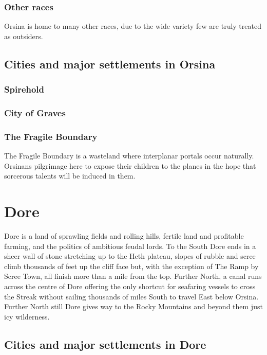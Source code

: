 \documentclass[10pt,twoside,twocolumn,openany,justified,bg=full,nomultitoc]{dndbook}
\begin{document}
\subsection{Other races}
\label{sec-3-3-7}
Orsina is home to many other races, due to the wide variety few are truly treated as outsiders.

\section{Cities and major settlements in Orsina}
\label{sec-3-4}
\subsection{Spirehold}
\label{sec-3-4-1}
\subsection{City of Graves}
\label{sec-3-4-2}
\subsection{The Fragile Boundary}
\label{sec-3-4-3}
The Fragile Boundary is a wasteland where interplanar portals occur naturally. Orsinans pilgrimage here to expose their children to the planes in the hope that sorcerous talents will be induced in them.  

\chapter{Dore}
\label{sec-4}
Dore is a land of sprawling fields and rolling hills, fertile land and profitable farming, and the politics of ambitious feudal lords. To the South Dore ends in a sheer wall of stone stretching up to the Heth plateau, slopes of rubble and scree climb thousands of feet up the cliff face but, with the exception of The Ramp by Scree Town, all finish more than a mile from the top. Further North, a canal runs across the centre of Dore offering the only shortcut for seafaring vessels to cross the Streak without sailing thousands of miles South to travel East below Orsina. Further North still Dore gives way to the Rocky Mountains and beyond them just icy wilderness.

\section{Cities and major settlements in Dore}
\label{sec-4-1}
\end{document}

